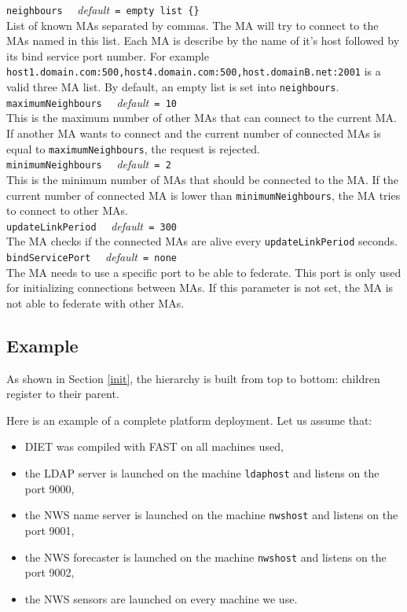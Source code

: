 \noindent
\texttt{neighbours} \ \ \emph{default}\texttt{ = empty list \{\}} \\
List of known MAs separated by commas. The MA
will try to connect to the MAs named in this list. Each MA is describe
by the name of it's host followed by its bind service port number. For
example
\texttt{host1.domain.com:500,host4.domain.com:500,host.domainB.net:2001}
is a valid three MA list. By default, an empty list is set into
\texttt{neighbours}.\\

\noindent
\texttt{maximumNeighbours} \ \ \emph{default}\texttt{ = 10}\\ This is
the maximum number of other MAs that can connect to the current MA.
If another MA wants to connect and the current number of connected
MAs is equal to \texttt{maximumNeighbours}, the request is
rejected.\\

\noindent
\texttt{minimumNeighbours} \ \ \emph{default}\texttt{ = 2}\\ This is
the minimum number of MAs that should be connected to the MA. If the
current number of connected MA is lower than
\texttt{minimumNeighbours}, the MA tries to connect to other MAs.\\

\noindent
\texttt{updateLinkPeriod} \ \ \emph{default}\texttt{ = 300}\\ The MA
checks if the connected MAs are alive every \texttt{updateLinkPeriod}
seconds.\\

\noindent
\texttt{bindServicePort} \ \ \emph{default}\texttt{ = none}\\ 
The MA needs to use a specific port to be able to federate. This
port is only used for initializing connections between MAs. If this
parameter is not set, the MA is not able to federate with other
MAs.\\


\subsection{Example}
\label{sec:deploy_ex}

As shown in Section \ref{init}, the hierarchy is built from top to
bottom: children register to their parent.

Here is an example of a complete platform deployment. Let us assume
that:

\begin{itemize}
\item DIET was compiled with FAST on all machines used,
\item the LDAP server is launched on the machine \texttt{ldaphost} and listens
  on the port 9000,
\item the NWS name server is launched on the machine \texttt{nwshost} and
  listens on the port 9001,
\item the NWS forecaster is launched on the machine \texttt{nwshost} and
  listens on the port 9002,
\item the NWS sensors are launched on every machine we use.
\end{itemize}


